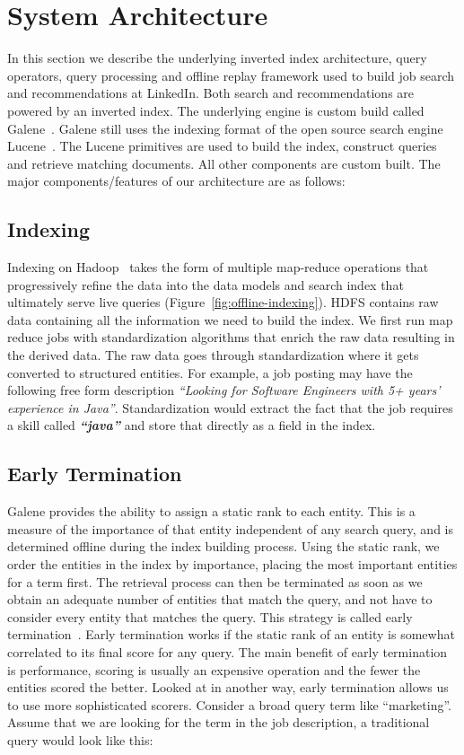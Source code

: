 \section{System Architecture} \label{sec:system-architecture}

In this section we describe the underlying inverted index architecture, query
operators, query processing and offline replay framework used to build job
search and recommendations at LinkedIn. Both search and recommendations are
powered by an inverted index. The underlying engine is custom build called
Galene~\cite{sriram2014}. Galene still uses the indexing format of the open
source search engine Lucene~\cite{mccandless2010lucene}. The Lucene primitives
are used to build the index, construct queries and retrieve matching documents.
All other components are custom built. The major components/features of our
architecture are as follows:

\subsection{Indexing}
Indexing on Hadoop~\cite{white2012hadoop} takes the form of multiple map-reduce operations that progressively refine the data into the data models 
and search index that ultimately serve live queries (Figure~\ref{fig:offline-indexing}).  
HDFS contains raw data containing all the information we need to build the index.  
We first run map reduce jobs with standardization algorithms that enrich the raw data resulting in the derived data.  
The raw data goes through standardization where it gets converted to structured
entities. For example, a job posting may have the following free form
description {\it ``Looking for Software Engineers with 5+ years' experience in
Java''}. Standardization would extract the fact that the job requires a skill
called {\it \bf ``java''} and store that directly as a field in the index. 

\subsection{Early Termination}
Galene provides the ability to assign a static rank to each entity.  This is a measure of the importance of that 
entity independent of any search query, and is determined offline during the index building process.  
Using the static rank, we order the entities in the index by importance, placing the most important entities for a term first.  
The retrieval process can then be terminated as soon as we obtain an adequate number of entities that match the query, 
and not have to consider every entity that matches the query.  This strategy is called 
early termination~\cite{anh2001vector,yan2010efficient,zhang2010revisiting}.
Early termination works if the static rank of an entity is somewhat correlated to its final score for any query.  
The main benefit of early termination is performance, scoring is usually an expensive operation and the fewer the entities scored the better.  
Looked at in another way, early termination allows us to use more sophisticated scorers. Consider a broad query term like ``marketing''. 
Assume that we are looking for the term in the job description, a traditional
query would look like this: 

